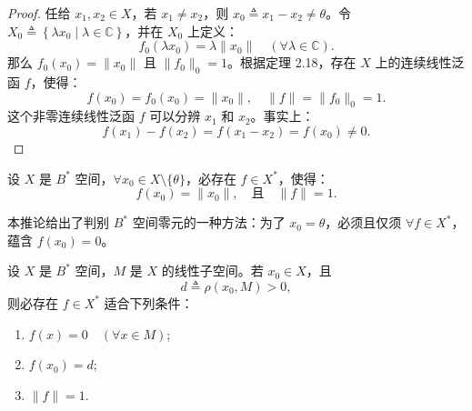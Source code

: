 \documentclass[lang=cn,newtx,10pt,scheme=chinese,thmcnt=chapter]{elegantbook}
\begin{document}
\begin{proof}
    任给 \( x_1, x_2 \in X \)，若 \( x_1 \neq x_2 \)，则 \( x_0 \triangleq x_1 - x_2 \neq \theta \)。令 \( X_0 \triangleq \left\{ \lambda x_0 \mid \lambda \in \mathbb{C} \right\} \)，并在 \( X_0 \) 上定义：
    \[
    f_0\left(\lambda x_0\right) = \lambda \|x_0\| \quad (\forall \lambda \in \mathbb{C}).
    \]
    那么 \( f_0(x_0) = \|x_0\| \) 且 \( \|f_0\|_0 = 1 \)。根据定理 2.18，存在 \( X \) 上的连续线性泛函 \( f \)，使得：
    \[
    f(x_0) = f_0(x_0) = \|x_0\|, \quad \|f\| = \|f_0\|_0 = 1.
    \]
    这个非零连续线性泛函 \( f \) 可以分辨 \( x_1 \) 和 \( x_2 \)。事实上：
    \[
    f(x_1) - f(x_2) = f(x_1 - x_2) = f(x_0) \neq 0.
    \]    
\end{proof}



\begin{corollary}
    设 \( X \) 是 \( B^* \) 空间，\( \forall x_0 \in X \setminus \{\theta\} \)，必存在 \( f \in X^* \)，使得：
\[
    f(x_0) = \|x_0\|, \quad \text{且} \quad \|f\| = 1.
    \]
\end{corollary}

\begin{note}
    本推论给出了判别 \( B^* \) 空间零元的一种方法：为了 \( x_0 = \theta \)，必须且仅须 \( \forall f \in X^* \)，蕴含 \( f(x_0) = 0 \)。
\end{note}
\begin{theorem}
    设 \( X \) 是 \( B^* \) 空间，\( M \) 是 \( X \) 的线性子空间。若 \( x_0 \in X \)，且
    \[
    d \triangleq \rho(x_0, M) > 0,
    \]
    则必存在 \( f \in X^* \) 适合下列条件：
    \begin{enumerate}
        \item \( f(x) = 0 \quad (\forall x \in M) \);
        \item \( f(x_0) = d \);
        \item \( \|f\| = 1 \).
    \end{enumerate}
\end{theorem}
\end{document}
